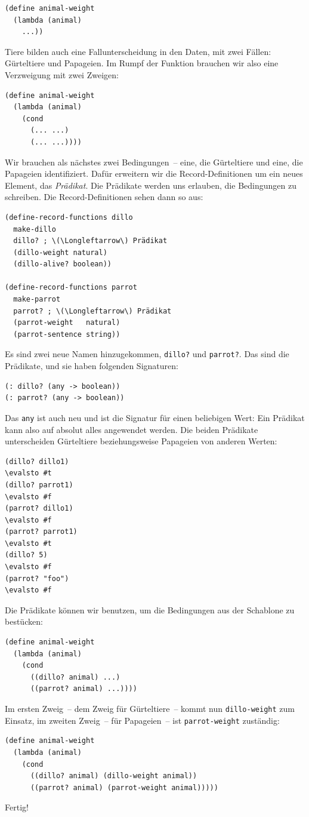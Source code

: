 %
\begin{lstlisting}
(define animal-weight
  (lambda (animal)
    ...))
\end{lstlisting}
%
Tiere bilden auch eine Fallunterscheidung in den Daten, mit zwei
Fällen: Gürteltiere und Papageien.  Im Rumpf der Funktion brauchen wir
also eine Verzweigung mit zwei Zweigen:
%
\begin{lstlisting}
(define animal-weight
  (lambda (animal)
    (cond
      (... ...)
      (... ...))))
\end{lstlisting}
%
Wir brauchen als nächstes zwei Bedingungen~-- eine, die Gürteltiere
und eine, die Papageien identifiziert.  Dafür erweitern wir die
Record-Definitionen um ein neues Element, das \textit{Prädikat}.
Die Prädikate werden uns erlauben, die Bedingungen zu
schreiben.  Die Record-Definitionen sehen dann so aus:
%
\begin{lstlisting}
(define-record-functions dillo
  make-dillo
  dillo? ; \(\Longleftarrow\) Prädikat
  (dillo-weight natural)
  (dillo-alive? boolean))

(define-record-functions parrot
  make-parrot
  parrot? ; \(\Longleftarrow\) Prädikat
  (parrot-weight   natural)
  (parrot-sentence string))
\end{lstlisting}
%
Es sind zwei neue Namen hinzugekommen, \lstinline{dillo?} und
\lstinline{parrot?}. Das sind die Prädikate, und sie haben folgenden
Signaturen:
%
\begin{lstlisting}
(: dillo? (any -> boolean))
(: parrot? (any -> boolean))
\end{lstlisting}
%
Das \lstinline{any} ist auch neu und ist die Signatur für einen
beliebigen Wert: Ein Prädikat kann also auf absolut alles angewendet
werden.  Die beiden Prädikate unterscheiden Gürteltiere
beziehungsweise Papageien von anderen Werten:
%
\begin{lstlisting}
(dillo? dillo1)
\evalsto #t
(dillo? parrot1)
\evalsto #f
(parrot? dillo1)
\evalsto #f
(parrot? parrot1)
\evalsto #t
(dillo? 5)
\evalsto #f
(parrot? "foo")
\evalsto #f
\end{lstlisting}
%
Die Prädikate können wir benutzen, um die Bedingungen aus der
Schablone zu bestücken:
%
\begin{lstlisting}
(define animal-weight
  (lambda (animal)
    (cond
      ((dillo? animal) ...)
      ((parrot? animal) ...))))
\end{lstlisting}
%
Im ersten Zweig~-- dem Zweig für Gürteltiere~-- kommt nun
\lstinline{dillo-weight} zum Einsatz, im zweiten Zweig~-- für
Papageien~-- ist \lstinline{parrot-weight} zuständig:
%
\begin{lstlisting}
(define animal-weight
  (lambda (animal)
    (cond
      ((dillo? animal) (dillo-weight animal))
      ((parrot? animal) (parrot-weight animal)))))
\end{lstlisting}
% 
Fertig!

